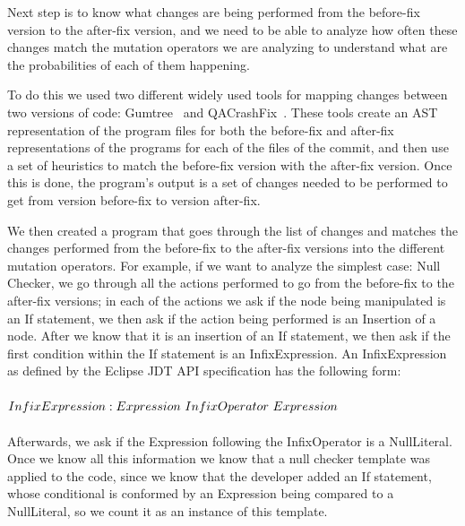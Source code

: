 \documentclass[conference]{IEEEtran}
\begin{document}
Next step is to know what changes are being performed from the before-fix version to 
the after-fix version, and we need to be able to analyze how often these changes match the mutation operators we are analyzing to understand what are 
the probabilities of each of them happening.

To do this we used two different widely used tools for mapping changes 
between two versions of code: Gumtree~\cite{falleri14} and QACrashFix~\cite{gao15}.
These tools create an AST representation of the program files for both the 
before-fix and after-fix representations of the programs for each of the files 
of the commit, and then use a set of heuristics to match the before-fix version 
with the after-fix version. Once this is done, the program's output is a set of 
changes needed to be performed to get from version before-fix to version 
after-fix.

We then created a program that goes through the list of changes and matches the changes performed from the before-fix to the after-fix versions into the different mutation operators. For example, if we want to analyze the simplest case: Null Checker, we go through all the actions performed to go from the before-fix to the after-fix versions; in each of the actions we ask if the node being manipulated is an If statement, we then  ask if the action being performed is an Insertion of a node. After we know that it is an insertion of an If statement, we then ask if the first condition within the If statement is an InfixExpression. An InfixExpression as defined by the Eclipse JDT API specification has the following form:
\\
\\
$InfixExpression: \\
Expression~InfixOperator~Expression
$
\\
\\  
Afterwards, we ask if the Expression following the InfixOperator is a NullLiteral. Once we know all this information we know that a null checker template was applied to the code, since we know that the developer added an If statement, whose conditional is conformed by an Expression being compared to a NullLiteral, so we count it as an instance of this template.




\end{document}
